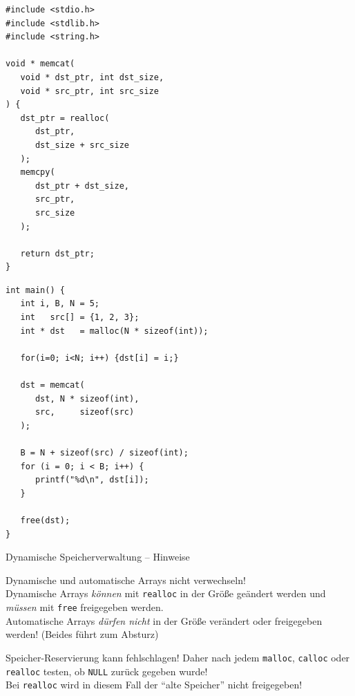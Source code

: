 \begin{frame}[fragile]
%
%
\begin{codebox}
\begin{verbatim}
#include <stdio.h>
#include <stdlib.h>
#include <string.h>

void * memcat(
   void * dst_ptr, int dst_size,
   void * src_ptr, int src_size
) {
   dst_ptr = realloc(
      dst_ptr, 
      dst_size + src_size
   );
   memcpy(
      dst_ptr + dst_size, 
      src_ptr, 
      src_size
   );

   return dst_ptr;
}
\end{verbatim}
\end{codebox}
%
\begin{codebox}[...Fortsetzung]
\begin{verbatim}
int main() {
   int i, B, N = 5;
   int   src[] = {1, 2, 3};
   int * dst   = malloc(N * sizeof(int));

   for(i=0; i<N; i++) {dst[i] = i;}

   dst = memcat(
      dst, N * sizeof(int), 
      src,     sizeof(src)
   );

   B = N + sizeof(src) / sizeof(int);
   for (i = 0; i < B; i++) {
      printf("%d\n", dst[i]);
   }

   free(dst);
}
\end{verbatim}
\end{codebox}
%
\end{frame}


\begin{frame}{Dynamische Speicherverwaltung -- Hinweise}
%
%
\begin{warnbox}
Dynamische und automatische Arrays nicht verwechseln!\\
Dynamische Arrays \emph{können} mit \texttt{realloc} in der Größe geändert werden und \emph{müssen} mit \texttt{free} freigegeben werden.\\
Automatische Arrays \emph{dürfen nicht} in der Größe verändert oder freigegeben werden! (Beides führt zum Absturz)
\end{warnbox}
%
\begin{hintbox}
Speicher-Reservierung kann fehlschlagen! Daher nach jedem \texttt{malloc}, \texttt{calloc} oder \texttt{realloc} testen, ob \texttt{NULL} zurück gegeben wurde!\\
Bei \texttt{realloc} wird in diesem Fall der \enquote{alte Speicher} nicht freigegeben!
\end{hintbox}
%
\end{frame}

